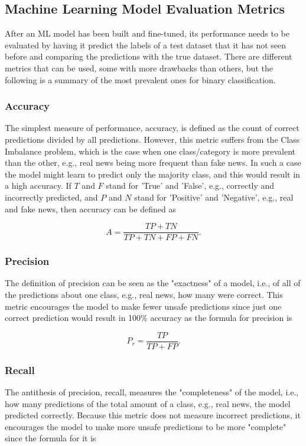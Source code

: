 \documentclass{l4proj}
\begin{document}
\subsection{Machine Learning Model Evaluation Metrics}

After an ML model has been built and fine-tuned, its performance needs to be evaluated by having it predict the labels of a test dataset that it has not seen before and comparing the predictions with the true dataset. There are different metrics that can be used, some with more drawbacks than others, but the following is a summary of the most prevalent ones for binary classification.

\subsubsection{Accuracy}

The simplest measure of performance, accuracy, is defined as the count of correct predictions divided by all predictions. However, this metric suffers from the Class Imbalance problem, which is the case when one class/category is more prevalent than the other, e.g., real news being more frequent than fake news. In such a case the model might learn to predict only the majority class, and this would result in a high accuracy. If $T$ and $F$ stand for 'True' and 'False', e.g., correctly and incorrectly predicted, and $P$ and $N$ stand for 'Positive' and 'Negative', e.g., real and fake news, then accuracy can be defined as

\[A=\frac{TP+TN}{TP+TN+FP+FN}.\]

\subsubsection{Precision}

The definition of precision can be seen as the "exactness" of a model, i.e., of all of the predictions about one class, e.g., real news, how many were correct. This metric encourages the model to make fewer unsafe predictions since just one correct prediction would result in 100\% accuracy as the formula for precision is

\[P_r=\frac{TP}{TP+FP}.\]

\subsubsection{Recall}

The antithesis of precision, recall, measures the "completeness" of the model, i.e., how many predictions of the total amount of a class, e.g., real news, the model predicted correctly. Because this metric does not measure incorrect predictions, it encourages the model to make more unsafe predictions to be more "complete" since the formula for it is 
\end{document}
